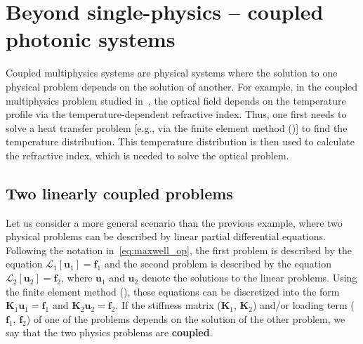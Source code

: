  \section{Beyond single-physics -- coupled photonic systems}\label{sec:coupled}

 Coupled multiphysics systems are physical systems where the solution to one physical 
 problem depends on the solution of another. For example, in the coupled multiphysics 
 problem studied in~\cite{ownpub0}, the optical field depends on the temperature profile via
 the temperature-dependent refractive index. Thus, one first needs to solve a heat transfer problem [e.g., via the finite element method ()] to find the temperature distribution. 
 This temperature distribution is then used to calculate the refractive index, which is needed to solve the optical problem.
    \subsection*{Two linearly coupled problems}
 Let us consider a more general scenario than the previous example, where two physical
 problems can be described by linear partial differential equations. Following the notation in~\eqref{eq:maxwell_op}, the
 first problem
 is described by the equation $\mathcal{L}_1 [\mathbf{u}_1]= \mathbf{f}_1$ and
 the second problem is described by the
 equation $\mathcal{L}_2 [\mathbf{u}_2]= \mathbf{f}_2$, where $\mathbf{u}_1$ and $\mathbf{u}_2$ denote the solutions to the linear problems. Using the finite element method (), these equations can be
 discretized into the form $\mathbf{K}_1 \mathbf{u}_1 = \mathbf{f}_1$ and $\mathbf{K}_2 \mathbf{u}_2 =
\mathbf{f}_2$.
 If the stiffness matrix ($\mathbf{K}_1$, $\mathbf{K}_2$) and/or loading term ($\mathbf{f}_1$, $\mathbf{f}_2$) of one of the problems depends on the solution of the
 other problem, we say that the two physics problems are
    \textbf{coupled}. 
    
